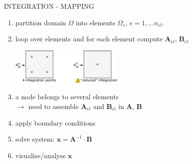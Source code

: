 INTEGRATION - MAPPING 



\begin{enumerate}

\item partition domain $\Omega$ into elements $\Omega_e$, $e=1, ... n_{el}$.


\item loop over elements and for each element compute ${\bm A}_{el}$, ${\bm B}_{el}$ \\
\begin{center}
\includegraphics[width=5.5cm]{images/integration.png}
\end{center}



\item a node belongs to several elements\\
      $\rightarrow$ need to assemble ${\bm A}_{el}$ and ${\bm B}_{el}$ in ${\bm A}$, ${\bm B}$

\item apply boundary conditions

\item solve system: ${\bm x}= {\bm A}^{-1} \cdot {\bm B}$
\item visualise/analyse ${\bm x}$
\end{enumerate}
